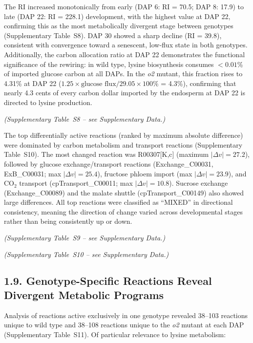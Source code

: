 \documentclass[12pt,a4paper]{article}
\begin{document}
The RI increased monotonically from early (DAP 6: RI = 70.5; DAP 8: 17.9) to late (DAP 22: RI = 228.1) development, with the highest value at DAP 22, confirming this as the most metabolically divergent stage between genotypes (Supplementary Table~S8). DAP 30 showed a sharp decline (RI = 39.8), consistent with convergence toward a senescent, low-flux state in both genotypes. Additionally, the carbon allocation ratio at DAP 22 demonstrates the functional significance of the rewiring: in wild type, lysine biosynthesis consumes $<0.01$\% of imported glucose carbon at all DAPs. In the \textit{o2} mutant, this fraction rises to 4.31\% at DAP 22 ($1.25 \times \text{glucose flux} / 29.05 \times 100\%$ = 4.3\%), confirming that nearly 4.3 cents of every carbon dollar imported by the endosperm at DAP 22 is directed to lysine production.


\noindent\textit{(Supplementary Table~S8 -- see Supplementary Data.)}


The top differentially active reactions (ranked by maximum absolute difference) were dominated by carbon metabolism and transport reactions (Supplementary Table~S10). The most changed reaction was R00307[K,c] (maximum $|\Delta v| = 27.2$), followed by glucose exchange/transport reactions (Exchange\_C00031, ExB\_C00031; max $|\Delta v| = 25.4$), fructose phloem import (max $|\Delta v| = 23.9$), and CO$_2$ transport (cpTransport\_C00011; max $|\Delta v| = 10.8$). Sucrose exchange (Exchange\_C00089) and the malate shuttle (cpTransport\_C00149) also showed large differences. All top reactions were classified as ``MIXED'' in directional consistency, meaning the direction of change varied across developmental stages rather than being consistently up or down.


\noindent\textit{(Supplementary Table~S9 -- see Supplementary Data.)}



\noindent\textit{(Supplementary Table~S10 -- see Supplementary Data.)}


\subsection{1.9. Genotype-Specific Reactions Reveal Divergent Metabolic Programs}

Analysis of reactions active exclusively in one genotype revealed 38--103 reactions unique to wild type and 38--108 reactions unique to the \textit{o2} mutant at each DAP (Supplementary Table~S11). Of particular relevance to lysine metabolism:
\end{document}
